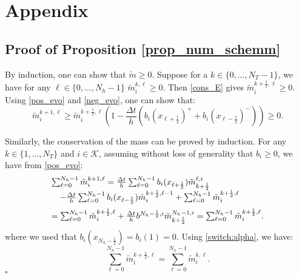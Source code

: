 \documentclass[conference]{IEEEtran}
\begin{document}



\appendix
\section{Appendix}\label{section_appendix}

\subsection{Proof of Proposition \ref{prop_num_schemm}}
By induction, one can show that $\tilde{m}\geq 0$. 
Suppose for a $k\in \{0,\ldots,N_T-1\}$, we have for any $\ell \in \{0,\ldots,N_h-1\}$  $\tilde{m}_i^{k,\ell}\geq 0$. Then \eqref{cons_E} %
gives $\tilde{m}_i^{k+\frac{1}{2},\ell}\geq 0$. Using \eqref{pos_evo} and \eqref{neg_evo}, one can show that:
\begin{equation*}
\tilde{m}_i^{k+1,\ell}\geq \tilde{m}_i^{k+\frac{1}{2},\ell}\left(1-\frac{\Delta t}{h}(b_i(x_{\ell +\frac{1}{2}})^++b_i(x_{\ell -\frac{1}{2}})^-)\right)\geq 0.
\end{equation*}

Similarly, the conservation of the mass can be proved by induction.
For any $k\in \{1,\ldots,N_T\}$ and $i\in \mathcal{K}$, assuming without loss of generality that $b_i\geq 0$, we have from \eqref{pos_evo}:
\begin{equation*}
\begin{array}{l}
\sum_{\ell=0}^{N_h-1} 
\tilde{m}_i^{k+1,\ell} 
=  \frac{\Delta t}{h}\sum_{\ell=0}^{N_h-1}  b_i(x_{\ell+\frac{1}{2}})\tilde{m}_{k+\frac{1}{2}}^{\ell,i}
\\ \quad-\frac{\Delta t}{h}\sum_{\ell=0}^{N_h-1}b_i(x_{\ell-\frac{1}{2}})\tilde{m}_i^{k+\frac{1}{2},\ell-1}+  \sum_{\ell=0}^{N_h-1} \tilde{m}_i^{k+\frac{1}{2},\ell} \vspace{2mm}  \\
=\sum_{\ell=0}^{N_h-1} \tilde{m}_i^{k+\frac{1}{2},\ell}
+\frac{\Delta t}{h} b^{N_h-\frac{1}{2},i}\tilde{m}_{k+\frac{1}{2}}^{N_h-1,i}

=\sum_{\ell=0}^{N_h-1} \tilde{m}^{k+\frac{1}{2},\ell}_i.
\end{array}
\end{equation*}
where we used that  $b_i(x_{N_h-\frac{1}{2}})=b_i(1)=0$. Using \eqref{switch:alpha}, we have:
\begin{equation*}
\sum_{\ell=0}^{N_h-1} \tilde{m}^{k+\frac{1}{2},\ell}_i = 
\sum_{\ell=0}^{N_h-1} \tilde{m}^{k,\ell}_i.
\end{equation*}
\hfill{$\square$}
\end{document}
